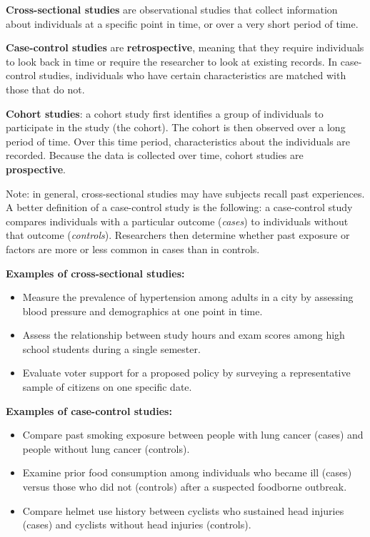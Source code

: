 \documentclass{ximera}
\begin{document}
\begin{definition}
\textbf{Cross-sectional studies} are observational studies that collect information about individuals at a specific point in time, or over a very short period of time.

\textbf{Case-control studies} are \textbf{retrospective}, meaning that they require individuals to look back in time or require the researcher to look at existing records. In case-control studies, individuals who have certain characteristics are matched with those that do not.

\textbf{Cohort studies}: a cohort study first identifies a group of individuals to participate in the study (the cohort). The cohort is then observed over a long period of time. Over this time period, characteristics about the individuals are recorded. Because the data is collected over time, cohort studies are \textbf{prospective}.
\end{definition}

Note: in general, cross-sectional studies may have subjects recall past experiences. A better definition of a case-control study is the following: a case-control study compares individuals with a particular outcome (\emph{cases}) to individuals without that outcome (\emph{controls}). Researchers then determine whether past exposure or factors are more or less common in cases than in controls.

\textbf{Examples of cross-sectional studies:}
\begin{itemize}
  \item Measure the prevalence of hypertension among adults in a city by assessing blood pressure and demographics at one point in time.
  \item Assess the relationship between study hours and exam scores among high school students during a single semester.
  \item Evaluate voter support for a proposed policy by surveying a representative sample of citizens on one specific date.
\end{itemize}

\textbf{Examples of case-control studies:}
\begin{itemize}
  \item Compare past smoking exposure between people with lung cancer (cases) and people without lung cancer (controls).
  \item Examine prior food consumption among individuals who became ill (cases) versus those who did not (controls) after a suspected foodborne outbreak.
  \item Compare helmet use history between cyclists who sustained head injuries (cases) and cyclists without head injuries (controls).
\end{itemize}
\end{document}
